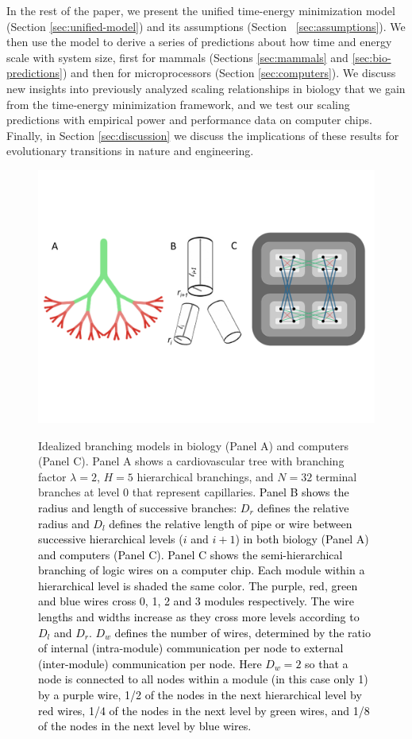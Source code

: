 \documentclass[12pt]{article}
\newcommand{\red}[1]{\textcolor{black}{#1}}
\begin{document}
In the rest of the paper, we present the unified time-energy minimization model
(Section \ref{sec:unified-model}) and its assumptions (Section ~\ref{sec:assumptions}).  We then use the model to derive a
series of predictions about how time and energy scale with system size, first
for mammals (Sections \ref{sec:mammals} and \ref{sec:bio-predictions}) and then for microprocessors (Section
\ref{sec:computers}). We discuss new insights into previously analyzed
scaling relationships in biology that we gain from the time-energy minimization
framework, and we test our scaling predictions with empirical power and performance
data on computer chips.  Finally, in Section \ref{sec:discussion}  we discuss
the implications of these results for evolutionary transitions in nature and
engineering.

\begin{figure}[!h]
\centering
\includegraphics[width=\textwidth]{Figures/Figure1Draft4.pdf}
\label{fig:firstfig}

\caption{Idealized branching models in biology (Panel A) and computers
  (Panel C). Panel A shows a cardiovascular tree with branching factor $\lambda
  = 2$, $H = 5$ hierarchical branchings, and $N = 32$ terminal
  branches at level 0 that represent capillaries. \red{Panel B shows the radius and length of successive branches: $D_r$ defines the relative radius and $D_l$ defines the relative length of pipe or wire between successive hierarchical levels ($i$ and $i+1$) in both biology (Panel A) and computers (Panel C). Panel C shows the semi-hierarchical branching of logic wires on a computer chip. Each module within a
  hierarchical level is shaded the same color. The purple, red, green and blue wires cross 0, 1, 2 and 3 modules respectively. The wire lengths and widths increase as they cross more levels according to $D_l$ and $D_r$. $D_w$ defines the number of wires, determined by the ratio of internal (intra-module) communication per
  node to external (inter-module) communication per node. Here $D_w = 2$ so that a node is connected to all nodes within a module (in this case only 1) by a purple wire, 1/2 of the nodes in the next hierarchical level by red wires, 1/4 of the nodes in the next level by green wires, and 1/8 of the nodes in the next level by blue wires.}}

\end{figure}
\end{document}
